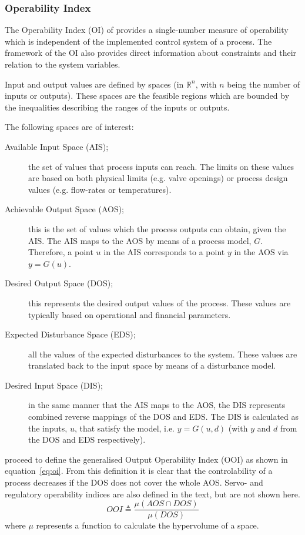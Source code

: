 \documentclass[final,authoryear,5pt,times,twocolumn]{elsarticle}
\begin{document}
\subsubsection{Operability Index}
The Operability Index (OI) of \citet{vinsonartoi} provides a single-number measure of operability which is independent of the implemented control system of a process.
The framework of the OI also provides direct information about constraints and their relation to the system variables.

Input and output values are defined by spaces (in $\mathbb{R}^n$, with $n$ being the number of inputs or outputs). 
These spaces are the feasible regions which are bounded by the inequalities describing the ranges of the inputs or outputs. 

The following spaces are of interest:
\begin{description}
  \item [Available Input Space (AIS);] the set of values that process      inputs can reach. 
The limits on these values are based on both physical limits (e.g.     valve openings) or process design values (e.g. flow-rates or temperatures). 
  \item [Achievable Output Space (AOS);] this is the set of values which the process outputs can obtain, given the AIS. 
The AIS maps to the AOS by means of a process model, $G$. 
Therefore, a point $u$ in the AIS corresponds to a point $y$ in the AOS via $y=G(u)$. 
  \item [Desired Output Space (DOS);] this represents the desired output values of the process. 
These values are typically based on operational and financial   parameters. 
  \item [Expected Disturbance Space (EDS);] all the values of the expected disturbances to the system. 
These values are translated back to the input space by means of a disturbance model.
  \item [Desired Input Space (DIS);] in the same manner that the AIS maps to the AOS, the DIS represents combined reverse mappings of the DOS and EDS.
The DIS is calculated as the inputs, $u$, that satisfy the model, i.e. $y=G(u,d)$ (with $y$ and $d$ from the DOS and EDS respectively).
\end{description}

\citet{vinsonartoi} proceed to define the generalised Output Operability Index (OOI) as shown in equation~\ref{eq:oi}. 
From this definition it is clear that the controlability of a process decreases if the DOS does not cover the whole AOS. 
Servo- and regulatory operability indices are also defined in the text, but are not shown here.
\begin{equation}
  \label{eq:oi}
     OOI \triangleq \frac{\mu(AOS\cap DOS)}{\mu(DOS)}
\end{equation}
where $\mu$ represents a function to calculate the hypervolume of a space.
\end{document}
